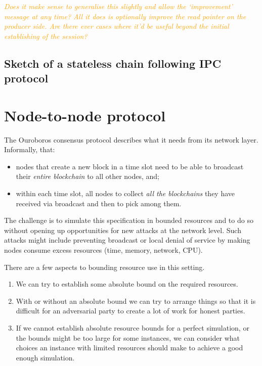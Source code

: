 \documentclass{article}
\newcommand{\dcoutts}[1]{\textcolor{orange}{\emph{#1}}}
\theoremstyle{definition}{
  \newtheorem{lemma}{Lemma}[section] %
  \newtheorem{definition}[lemma]{Definition}
}
\theoremstyle{theorem}{
  \newtheorem{invariant}[lemma]{Invariant}
  \newtheorem{proofobligation}[lemma]{Proof Obligation}
}
\numberwithin{equation}{lemma}
\begin{document}
\dcoutts{Does it make sense to generalise this slightly and allow the
`improvement' message at any time? All it does is optionally improve the read
pointer on the producer side. Are there ever cases where it'd be useful beyond
the initial establishing of the session?}

\subsection{Sketch of a stateless chain following IPC protocol}



\section{Node-to-node protocol}

The Ouroboros consensus protocol \citep{ouroboros-classic, ouroboros-genesis}
describes what it needs from its network layer. Informally, that:
\begin{itemize}
\item nodes that create a new block in a time slot need to be able to broadcast
      their \emph{entire blockchain} to all other nodes, and;
\item within each time slot, all nodes to collect \emph{all the blockchains}
      they have received via broadcast and then to pick among them.
\end{itemize}

The challenge is to simulate this specification in bounded resources and to do
so without opening up opportunities for new attacks at the network level. Such
attacks might include preventing broadcast or local denial of service by making
nodes consume excess resources (time, memory, network, CPU).

There are a few aspects to bounding resource use in this setting.
\begin{enumerate}
\item We can try to establish some absolute bound on the required resources.
\item With or without an absolute bound we can try to arrange things so that it
      is difficult for an adversarial party to create a lot of work for honest
      parties.
\item If we cannot establish absolute resource bounds for a perfect simulation,
      or the bounds might be too large for some instances, we can consider what
      choices an instance with limited resources should make to achieve a good
      enough simulation.
\end{enumerate}
\end{document}
